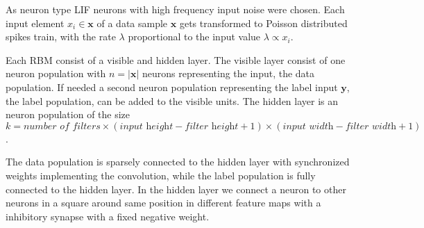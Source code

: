 As neuron type LIF neurons with high frequency input noise were chosen.
Each input element $x_i \in \textbf{x}$ of a data sample $\textbf{x}$ gets transformed to Poisson distributed spikes train, with the rate $\lambda$ proportional to the input value $\lambda \propto x_i$. 

Each RBM consist of a visible and hidden layer. 
The visible layer consist of one neuron population with $n = |\textbf{x}|$ neurons representing the input, the data population. 
If needed a second neuron population representing the label input $\textbf{y}$, the label population, can be added to the visible units.
The hidden layer is an neuron population of the size  $ k = \textit{number of filters} \times (\textit{input height} - \textit{filter height} + 1) \times (\textit{input width} - \textit{filter width} + 1)$.

The data population is sparsely connected to the hidden layer with synchronized weights implementing the convolution, while the label population is fully connected to the hidden layer.
In the hidden layer we connect a neuron to other neurons in a square around same position in different feature maps with a inhibitory synapse with a fixed negative weight.

